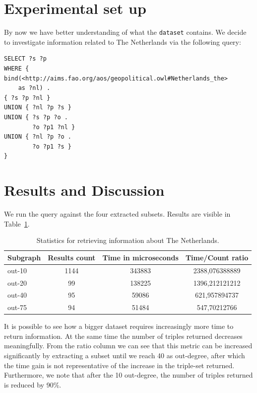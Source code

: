 \documentclass[runningheads,a4paper]{../../StyleFiles/llncs}
\begin{document}
\section{Experimental set up}
By now we have better understanding of what the \texttt{dataset} contains. We decide to investigate information related to The Netherlands via the following query:

\begin{lstlisting}[captionpos=b, caption=SPARQL query for calculating out degree of entities, label=lst:sparql, basicstyle=\ttfamily\small,frame=bt]
SELECT ?s ?p
WHERE { bind(<http://aims.fao.org/aos/geopolitical.owl#Netherlands_the> 
	as ?nl) .
{ ?s ?p ?nl }
UNION { ?nl ?p ?s }
UNION { ?s ?p ?o .
		?o ?p1 ?nl }
UNION {	?nl ?p ?o .
		?o ?p1 ?s }
}
\end{lstlisting}

\section{Results and Discussion}
We run the query against the four extracted subsets. Results are visible in Table~\ref{query_table}. 

\begin{table}[h]
	\begin{center}
		\begin{tabular}{| l | c | c | c |}
			\hline
			\textbf{Subgraph} & \textbf{Results count} & \textbf{Time in microseconds} & \textbf{Time/Count ratio} \\ \hline
			out-10 & 1144 & 343883 & 2388,076388889 \\ \hline
			out-20 & 99 & 138225 & 1396,212121212 \\ \hline
			out-40 & 95 & 59086 & 621,957894737 \\ \hline
			out-75 & 94 & 51484 & 547,70212766 \\ \hline
		\end{tabular}
		\caption{Statistics for retrieving information about The Netherlands.}
		\label{query_table}
	\end{center}
\end{table}

It is possible to see how a bigger dataset requires
increasingly more time to return information. At the same time the number
of triples returned decreases meaningfully. From the ratio column we can see that
this metric can be increased significantly by extracting a subset until we reach
40 as out-degree, after which the time gain is not representative of the increase in the triple-set returned. Furthermore, we note that after the 10 out-degree, the number of triples returned is reduced by 90\%.
\end{document}

